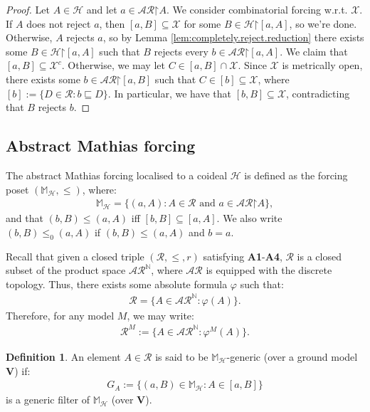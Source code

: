 \documentclass[11pt,reqno]{amsart}
\theoremstyle{plain}
\numberwithin{equation}{section}
\theoremstyle{definition}
\newtheorem{definition}[theorem]{Definition}
\newcommand{\N}{\mathbb{N}}
\newcommand{\cal}{\mathcal}
\renewcommand{\bf}{\mathbf}
\newcommand{\restrictedto}{\mathord{\upharpoonright}}
\newcommand{\V}{\bf{V}}
\newcommand{\X}{\cal{X}}
\renewcommand{\H}{\cal{H}}
\begin{document}
\begin{proof}
    Let $A \in \H$ and let $a \in \cal{AR}\restrictedto A$. We consider combinatorial forcing w.r.t. $\X$. If $A$ does not reject $a$, then $[a,B] \subseteq \X$ for some $B \in \H\restrictedto[a,A]$, so we're done. Otherwise, $A$ rejects $a$, so by Lemma \ref{lem:completely.reject.reduction} there exists some $B \in \H\restrictedto[a,A]$ such that $B$ rejects every $b \in \cal{AR}\restrictedto[a,A]$. We claim that $[a,B] \subseteq \X^c$. Otherwise, we may let $C \in [a,B] \cap \X$. Since $\X$ is metrically open, there exists some $b \in \cal{AR}\restrictedto[a,B]$ such that $C \in [b] \subseteq \X$, where $[b] := \{D \in \cal{R} : b \sqsubseteq D\}$. In particular, we have that $[b,B] \subseteq \X$, contradicting that $B$ rejects $b$.
\end{proof}

\subsection{Abstract Mathias forcing}
The abstract Mathias forcing localised to a coideal $\H$ is defined as the forcing poset $(\mathbb{M}_\H,\leq)$, where:
\begin{align*}
    \mathbb{M}_\H = \{(a,A) : A \in \cal{R} \text{ and } a \in \cal{AR}\restrictedto A\},
\end{align*}
and that $(b,B) \leq (a,A)$ iff $[b,B] \subseteq [a,A]$. We also write $(b,B) \leq_0 (a,A)$ if $(b,B) \leq (a,A)$ and $b = a$. 

Recall that given a closed triple $(\cal{R},\leq,r)$ satisfying \textbf{A1}-\textbf{A4}, $\cal{R}$ is a closed subset of the product space $\cal{AR}^\N$, where $\cal{AR}$ is equipped with the discrete topology. Thus, there exists some absolute formula $\varphi$ such that:
\begin{align*}
    \cal{R} = \{A \in \cal{AR}^\N : \varphi(A)\}.
\end{align*}
Therefore, for any model $M$, we may write:
\begin{align*}
    \cal{R}^M := \{A \in \cal{AR}^\N : \varphi^M(A)\}.
\end{align*}

\begin{definition}
    An element $A \in \cal{R}$ is said to be $\mathbb{M}_\H$-generic (over a ground model $\V$) if:
    \begin{align*}
        G_A := \{(a,B) \in \mathbb{M}_\H : A \in [a,B]\}
    \end{align*}
    is a generic filter of $\mathbb{M}_\H$ (over $\V$).
\end{definition}
\end{document}
